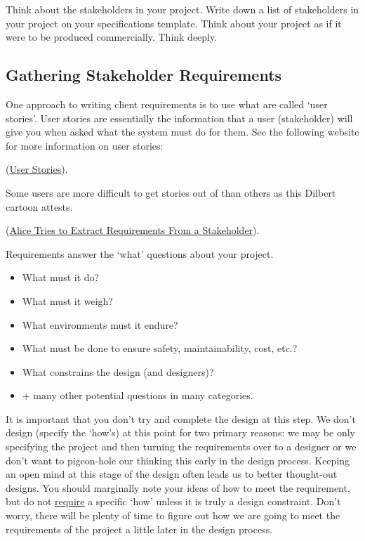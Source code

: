 \begin{slshape}
\color{blue}

\StopSign  Think about the stakeholders in your project.  Write down a list of stakeholders in your project on your specifications template.  Think about your project as if it were to be produced commercially.  Think deeply.
\bigskip

\subsection*{Gathering Stakeholder Requirements}  
	
One approach to writing client requirements is to use what are called `user stories'.  User stories are essentially the information that a user (stakeholder) will give you when asked what the system must do for them.  See the following website	for more information on user stories:
\bigskip
	
(\href{https://www.mountaingoatsoftware.com/agile/user-stories}{User Stories}).  
\bigskip  

Some users are more difficult to get stories out of than others as this Dilbert cartoon attests.
\bigskip

(\href{http://dilbert.com/strip/2006-01-29}{Alice Tries to Extract Requirements From a Stakeholder}).
\bigskip

Requirements answer the `what' questions about your project.  

\begin{itemize}
	\item What must it do?
	\item What must it weigh?  
	\item What environments must it endure?
	\item What must be done to ensure safety, maintainability, cost, etc.?
	\item What constrains the design (and designers)?
	\item + many other potential questions in many categories.
\end{itemize}

It is important that you don't try and complete the design at this step.    We don't design (specify the `how's) at this point for two primary reasons: we may be only specifying the project and then turning the requirements over to a designer or we don't want to pigeon-hole our thinking this early in the design process.  Keeping an open mind at this stage of the design often leads us to better thought-out designs.  You should marginally note your ideas of how to meet the requirement, but do not {\underline{require}} a specific `how' unless it is truly a design constraint.  Don't worry, there will be plenty of time to figure out how we are going to meet the requirements of the project a little later in the design process.
\bigskip


\end{slshape}
